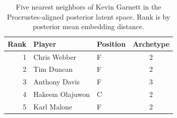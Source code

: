 \begin{table}[htbp]
  \centering\small
  \begin{tabular}{rllc}
    \toprule
    Rank & Player & Position & Archetype \\
    \midrule
    1 & Chris Webber & F & 2 \\
    2 & Tim Duncan & F & 2 \\
    3 & Anthony Davis & F & 3 \\
    4 & Hakeem Olajuwon & C & 2 \\
    5 & Karl Malone & F & 2 \\
    \bottomrule
  \end{tabular}
  \caption{Five nearest neighbors of Kevin Garnett in the Procrustes-aligned posterior latent space. Rank is by posterior mean embedding distance.}
  \label{tab:Kevin_Garnett_neighbors}
\end{table}

